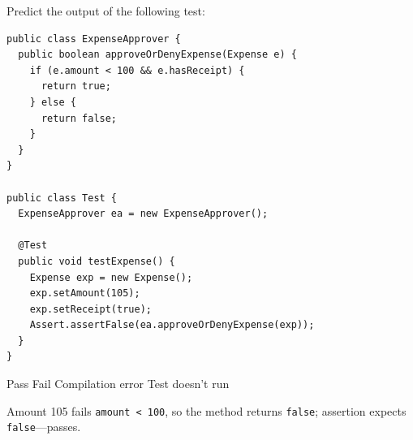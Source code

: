\newpage

\question[4]
Predict the output of the following test:
\begin{lstlisting}[basicstyle=\ttfamily\footnotesize,frame=single,breaklines=true,aboveskip=4pt,belowskip=4pt]
public class ExpenseApprover {
  public boolean approveOrDenyExpense(Expense e) {
    if (e.amount < 100 && e.hasReceipt) {
      return true;
    } else {
      return false;
    }
  }
}

public class Test {
  ExpenseApprover ea = new ExpenseApprover();

  @Test
  public void testExpense() {
    Expense exp = new Expense();
    exp.setAmount(105);
    exp.setReceipt(true);
    Assert.assertFalse(ea.approveOrDenyExpense(exp));
  }
}
\end{lstlisting}
\begin{choices}
  \CorrectChoice Pass
  \choice Fail
  \choice Compilation error
  \choice Test doesn't run
\end{choices}
\begin{solution}
  Amount 105 fails \texttt{amount < 100}, so the method returns \texttt{false}; assertion expects \texttt{false}---passes.
\end{solution}

